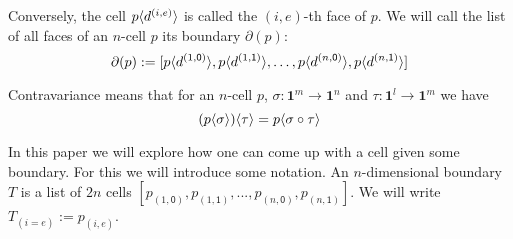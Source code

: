\documentclass[11pt]{article}
\theoremstyle{definition}
\newcommand{\mdef}{:=}
\newcommand{\mlist}[1]{[ {#1} ]}
\newcommand{\pint}[1]{\mathbf{1}^{#1}}
\newcommand{\pintrestr}[3]{\mathbf{1}^{#1}_{{#2}={#3}}}
\newcommand{\izero}{\mathsf{0}}
\newcommand{\ione}{\mathsf{1}}
\newcommand{\restrict}[2]{{#1}|_{#2}}
\newcommand{\smap}[1]{s^{{#1}}}
\newcommand{\dmap}[2]{d^{({#1} , {#2})}}
\newcommand{\cont}[2]{\ensuremath{ \ifthenelse{\equal{#2}{}}{#1}{{#1}\langle{#2}\rangle}} }
\newcommand{\boundary}[1]{\partial({#1})}
\newcommand{\comp}[2]{\mathsf{Comp}({#1}\ {#2})}
\begin{document}
Conversely, the cell $\cont{p}{\dmap{i}{e}}$ is called the $(i,e)$-th face of $p$. We
will call the list of all faces of an $n$-cell $p$ its boundary $\boundary{p}$:
$$\boundary{p} \mdef \mlist{ \cont{p}{\dmap{1}{\izero}},
  \cont{p}{\dmap{1}{\ione}} , \ldots , \cont{p}{\dmap{n}{\izero}}, \cont{p}{\dmap{n}{\ione}} }$$




Contravariance means that for an $n$-cell $p$, $\sigma : \pint{m} \to \pint{n}$ and $\tau : \pint{l} \to \pint{m}$ we have
$$\cont{(\cont{p}{\sigma})}{\tau} = \cont{p}{\sigma \circ \tau}$$



In this paper we will explore how one can come up with a cell given some
boundary. For this we will introduce some notation. An
$n$-dimensional boundary $T$ is a list of $2n$ cells $\mlist{p_{(1,\izero)},
  p_{(1,\ione)} , ... , p_{(n,\izero)}, p_{(n, \ione)}}$. We will write
$T_{(i=e)} \mdef p_{(i,e)}$. %






\end{document}

